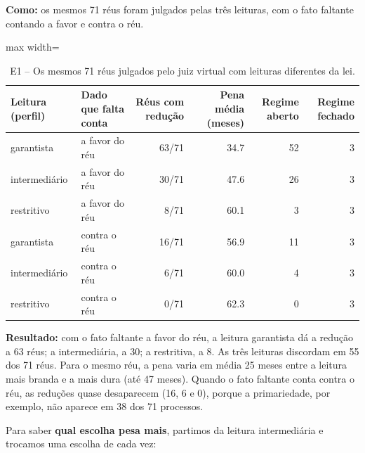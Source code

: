 \textbf{Como:} os mesmos 71 réus foram julgados pelas três leituras, com o fato faltante
contando a favor e contra o réu.

\begin{table}[h]
\centering\small
\caption{E1 -- Os mesmos 71 réus julgados pelo juiz virtual com leituras diferentes da lei.}
\label{tab:e1-resumo}
\begin{adjustbox}{max width=\textwidth}
\begin{tabular}{llrrrr}
\toprule
Leitura (perfil) & Dado que falta conta & Réus com redução & Pena média (meses) & Regime aberto & Regime fechado \\
\midrule
garantista & a favor do réu & 63/71 & 34.7 & 52 & 3 \\
intermediário & a favor do réu & 30/71 & 47.6 & 26 & 3 \\
restritivo & a favor do réu & 8/71 & 60.1 & 3 & 3 \\
garantista & contra o réu & 16/71 & 56.9 & 11 & 3 \\
intermediário & contra o réu & 6/71 & 60.0 & 4 & 3 \\
restritivo & contra o réu & 0/71 & 62.3 & 0 & 3 \\
\bottomrule
\end{tabular}
\end{adjustbox}
\end{table}

\textbf{Resultado:} com o fato faltante a favor do réu, a leitura garantista dá a redução a
63 réus; a intermediária, a 30; a restritiva, a 8. As três leituras discordam em 55 dos 71
réus. Para o mesmo réu, a pena varia em média 25 meses entre a leitura mais branda e a mais
dura (até 47 meses). Quando o fato faltante conta contra o réu, as reduções quase desaparecem
(16, 6 e 0), porque a primariedade, por exemplo, não aparece em 38 dos 71 processos.

Para saber \textbf{qual escolha pesa mais}, partimos da leitura intermediária e trocamos uma
escolha de cada vez:

